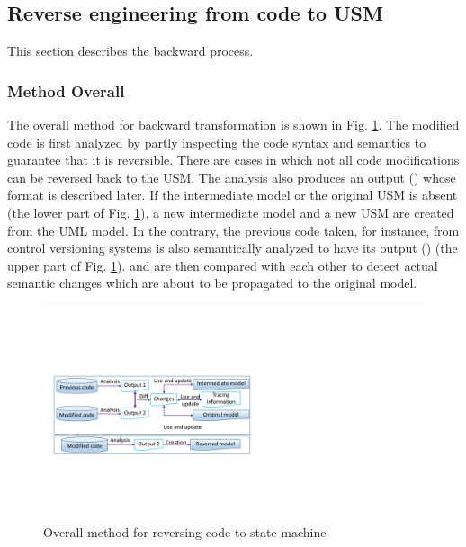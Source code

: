 \subsection{Reverse engineering from code to USM}
This section describes the backward process. 

\subsubsection{Method Overall}
The overall method for backward transformation is shown in Fig. \ref{fig:details}. The modified code is first analyzed by partly inspecting the code syntax and semantics to guarantee that it is reversible. There are cases in which not all code modifications can be reversed back to the USM. The analysis also produces an output () whose format is described later. If the intermediate model or the original USM is absent (the lower part of Fig. \ref{fig:details}), a new intermediate model and a new USM are created from the UML model. In the contrary, the previous code taken, for instance, from control versioning systems is also semantically analyzed to have its output () (the upper part of Fig. \ref{fig:details}).  and  are then compared with each other to detect actual semantic changes which are about to be propagated to the original model. 

\begin{figure}
\centering
\includegraphics[clip, trim=0.9cm 5.8cm 15.1cm 6.3cm, width=0.8\columnwidth]{figures/details2.pdf}
\caption{Overall method for reversing code to state machine} 
\label{fig:details}
\end{figure}


